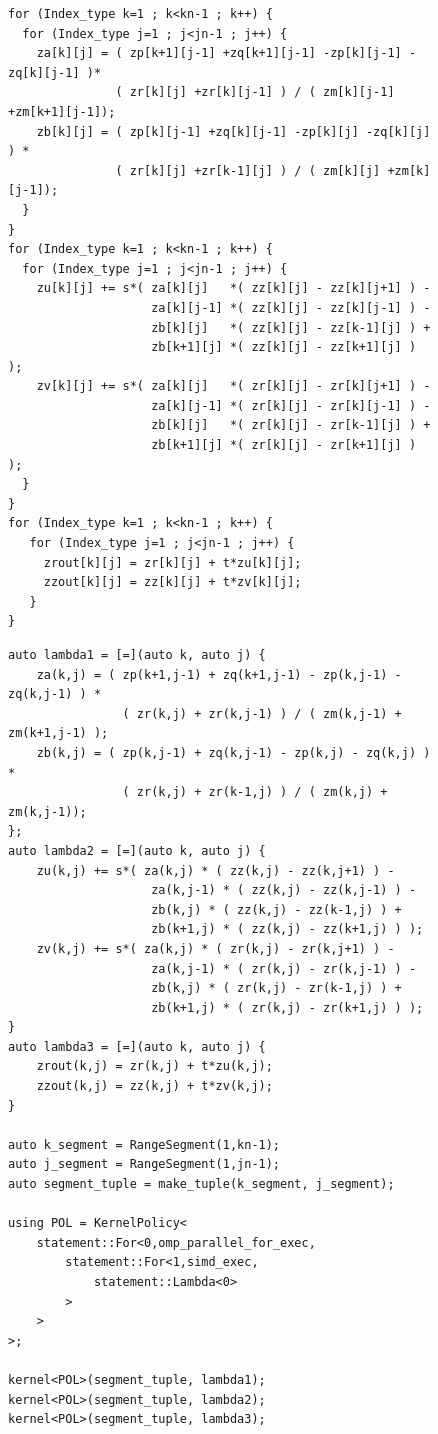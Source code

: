 \documentclass{article}
\begin{document}
\begin{figure}
\begin{lstlisting}[caption={C++ implementation of the \texttt{HYDRO\_2D} benchmark},label={HydroCpp}]
for (Index_type k=1 ; k<kn-1 ; k++) {
  for (Index_type j=1 ; j<jn-1 ; j++) {
    za[k][j] = ( zp[k+1][j-1] +zq[k+1][j-1] -zp[k][j-1] -zq[k][j-1] )*
               ( zr[k][j] +zr[k][j-1] ) / ( zm[k][j-1] +zm[k+1][j-1]);
    zb[k][j] = ( zp[k][j-1] +zq[k][j-1] -zp[k][j] -zq[k][j] ) *
               ( zr[k][j] +zr[k-1][j] ) / ( zm[k][j] +zm[k][j-1]);
  }
}
for (Index_type k=1 ; k<kn-1 ; k++) {
  for (Index_type j=1 ; j<jn-1 ; j++) {
    zu[k][j] += s*( za[k][j]   *( zz[k][j] - zz[k][j+1] ) -
                    za[k][j-1] *( zz[k][j] - zz[k][j-1] ) -
                    zb[k][j]   *( zz[k][j] - zz[k-1][j] ) +
                    zb[k+1][j] *( zz[k][j] - zz[k+1][j] ) );
    zv[k][j] += s*( za[k][j]   *( zr[k][j] - zr[k][j+1] ) -
                    za[k][j-1] *( zr[k][j] - zr[k][j-1] ) -
                    zb[k][j]   *( zr[k][j] - zr[k-1][j] ) +
                    zb[k+1][j] *( zr[k][j] - zr[k+1][j] ) );
  }
}
for (Index_type k=1 ; k<kn-1 ; k++) {
   for (Index_type j=1 ; j<jn-1 ; j++) {
     zrout[k][j] = zr[k][j] + t*zu[k][j];
     zzout[k][j] = zz[k][j] + t*zv[k][j];
   }
}   
\end{lstlisting}
\end{figure}


\begin{figure}
    \begin{lstlisting}[caption={RAJA implementation of the \texttt{HYDRO\_2D} benchmark},label={HydroRaja}]
auto lambda1 = [=](auto k, auto j) {
    za(k,j) = ( zp(k+1,j-1) + zq(k+1,j-1) - zp(k,j-1) - zq(k,j-1) ) *
                ( zr(k,j) + zr(k,j-1) ) / ( zm(k,j-1) + zm(k+1,j-1) ); 
    zb(k,j) = ( zp(k,j-1) + zq(k,j-1) - zp(k,j) - zq(k,j) ) * 
                ( zr(k,j) + zr(k-1,j) ) / ( zm(k,j) + zm(k,j-1));
};
auto lambda2 = [=](auto k, auto j) {
    zu(k,j) += s*( za(k,j) * ( zz(k,j) - zz(k,j+1) ) - 
                    za(k,j-1) * ( zz(k,j) - zz(k,j-1) ) - 
                    zb(k,j) * ( zz(k,j) - zz(k-1,j) ) + 
                    zb(k+1,j) * ( zz(k,j) - zz(k+1,j) ) ); 
    zv(k,j) += s*( za(k,j) * ( zr(k,j) - zr(k,j+1) ) - 
                    za(k,j-1) * ( zr(k,j) - zr(k,j-1) ) - 
                    zb(k,j) * ( zr(k,j) - zr(k-1,j) ) + 
                    zb(k+1,j) * ( zr(k,j) - zr(k+1,j) ) );
}
auto lambda3 = [=](auto k, auto j) {
    zrout(k,j) = zr(k,j) + t*zu(k,j); 
    zzout(k,j) = zz(k,j) + t*zv(k,j);
}

auto k_segment = RangeSegment(1,kn-1);
auto j_segment = RangeSegment(1,jn-1);
auto segment_tuple = make_tuple(k_segment, j_segment);
    
using POL = KernelPolicy<
    statement::For<0,omp_parallel_for_exec,
        statement::For<1,simd_exec,
            statement::Lambda<0>
        >
    >
>;

kernel<POL>(segment_tuple, lambda1);
kernel<POL>(segment_tuple, lambda2);
kernel<POL>(segment_tuple, lambda3);
\end{lstlisting}
\end{figure}
\end{document}
